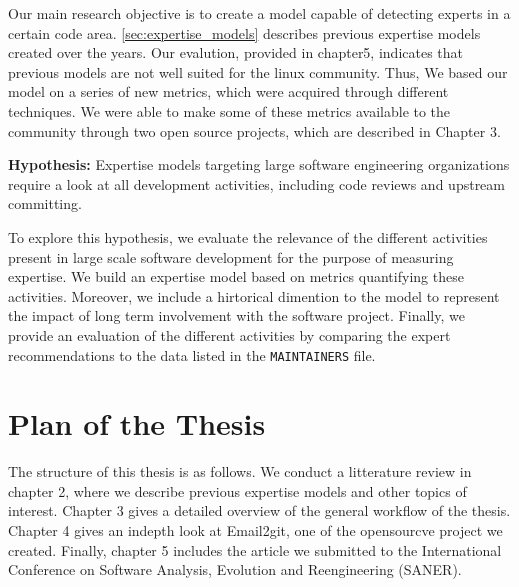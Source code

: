 Our main research objective is to create a model capable of detecting experts in a certain code area. \autoref{sec:expertise_models} describes previous expertise models created over the years. Our evalution, provided in chapter5, indicates that previous models are not well suited for the linux community. Thus, We based our model on a series of new metrics, which were acquired through different techniques. We were able to make some of these metrics available to the community through two open source projects, which are described in Chapter 3.


\textbf{Hypothesis:} Expertise models targeting large software engineering organizations require a look at all development activities, including code reviews and upstream committing.



To explore this hypothesis, we evaluate the relevance of the different activities present in large scale software development for the purpose of measuring expertise. We build an expertise model based on metrics quantifying these activities. Moreover, we include a hirtorical dimention to the model to represent the impact of long term involvement with the software project. Finally, we provide an evaluation of the different activities by comparing the expert recommendations to the data listed in the \texttt{MAINTAINERS} file.






\section{Plan of the Thesis}


The structure of this thesis is as follows. We conduct a litterature review in chapter 2, where we describe previous expertise models and other topics of interest. Chapter 3 gives a detailed overview of the general workflow of the thesis. Chapter 4 gives an indepth look at Email2git, one of the opensourcve project we created. Finally, chapter 5 includes the article we submitted to the  International Conference on Software Analysis, Evolution and Reengineering (SANER).




